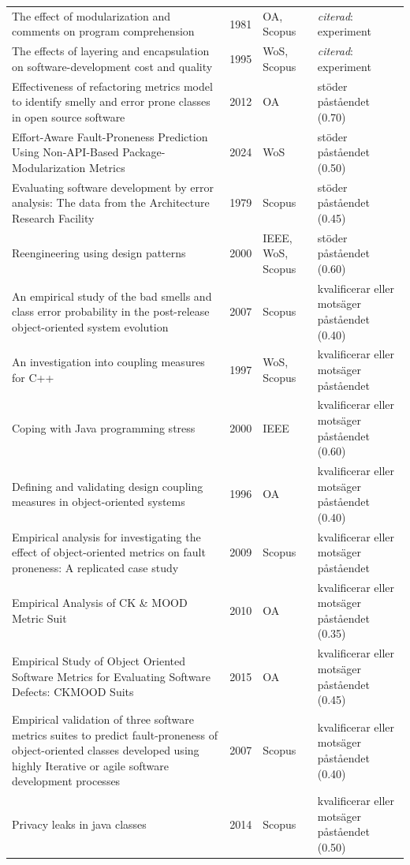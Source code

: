 \begin{longtable}{@{}%
  >{\raggedright\arraybackslash}p{}c%
  >{\raggedright\arraybackslash}p{}%
  >{\raggedright\arraybackslash}p{}@{}}
The effect of modularization and comments on program comprehension & 1981 & OA, Scopus & \emph{citerad}: experiment \\
The effects of layering and encapsulation on software-development cost and quality & 1995 & WoS, Scopus & \emph{citerad}: experiment \\
Effectiveness of refactoring metrics model to identify smelly and error prone classes in open source software & 2012 & OA & stöder påståendet (0.70) \\
Effort-Aware Fault-Proneness Prediction Using Non-API-Based Package-Modularization Metrics & 2024 & WoS & stöder påståendet (0.50) \\
Evaluating software development by error analysis: The data from the Architecture Research Facility & 1979 & Scopus & stöder påståendet (0.45) \\
Reengineering using design patterns & 2000 & IEEE, WoS, Scopus & stöder påståendet (0.60) \\
An empirical study of the bad smells and class error probability in the post-release object-oriented system evolution & 2007 & Scopus & kvalificerar eller motsäger påståendet (0.40) \\
An investigation into coupling measures for C++ & 1997 & WoS, Scopus & kvalificerar eller motsäger påståendet \\
Coping with Java programming stress & 2000 & IEEE & kvalificerar eller motsäger påståendet (0.60) \\
Defining and validating design coupling measures in object-oriented systems & 1996 & OA & kvalificerar eller motsäger påståendet (0.40) \\
Empirical analysis for investigating the effect of object-oriented metrics on fault proneness: A replicated case study & 2009 & Scopus & kvalificerar eller motsäger påståendet \\
Empirical Analysis of CK \& MOOD Metric Suit & 2010 & OA & kvalificerar eller motsäger påståendet (0.35) \\
Empirical Study of Object Oriented Software Metrics for Evaluating Software Defects: CKMOOD Suits & 2015 & OA & kvalificerar eller motsäger påståendet (0.45) \\
Empirical validation of three software metrics suites to predict fault-proneness of object-oriented classes developed using highly Iterative or agile software development processes & 2007 & Scopus & kvalificerar eller motsäger påståendet (0.40) \\
Privacy leaks in java classes & 2014 & Scopus & kvalificerar eller motsäger påståendet (0.50) \\

\end{longtable}
